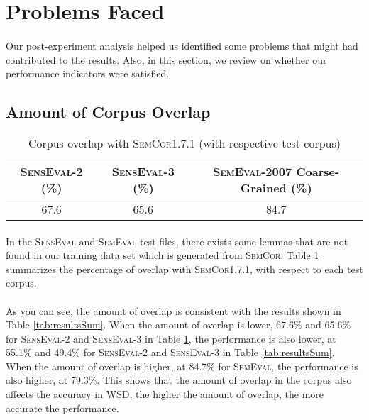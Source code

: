 \section{Problems Faced}
\paragraph{}
Our post-experiment analysis helped us identified some problems that might had contributed to the results. Also, in this section, we review on whether our performance indicators were satisfied.

\subsection{Amount of Corpus Overlap}
\begin{table}[h]
	\center
	\begin{tabular}{| c | c | c |}
		\hline
		\textsc{SensEval-2} (\%) & \textsc{SensEval-3} (\%) & \textsc{SemEval-2007} Coarse-Grained (\%) \\
		\hline
		67.6 & 65.6 & 84.7 \\
		\hline
	\end{tabular}
	\caption{Corpus overlap with \textsc{SemCor1.7.1} (with respective test corpus)}
	\label{tab:overlapPercentage}
\end{table}
\paragraph{}
In the \textsc{SensEval} and \textsc{SemEval} test files, there exists some lemmas that are not found in our training data set which is generated from \textsc{SemCor}. Table \ref{tab:overlapPercentage} summarizes the percentage of overlap with \textsc{SemCor1.7.1}, with respect to each test corpus.

\paragraph{}
As you can see, the amount of overlap is consistent with the results shown in Table \ref{tab:resultsSum}. When the amount of overlap is lower, 67.6\% and 65.6\% for \textsc{SensEval-2} and \textsc{SensEval-3} in Table \ref{tab:overlapPercentage}, the performance is also lower, at 55.1\% and 49.4\% for \textsc{SensEval-2} and \textsc{SensEval-3} in Table \ref{tab:resultsSum}. When the amount of overlap is higher, at 84.7\% for \textsc{SemEval}, the performance is also higher, at 79.3\%. This shows that the amount of overlap in the corpus also affects the accuracy in WSD, the higher the amount of overlap, the more accurate the performance.

